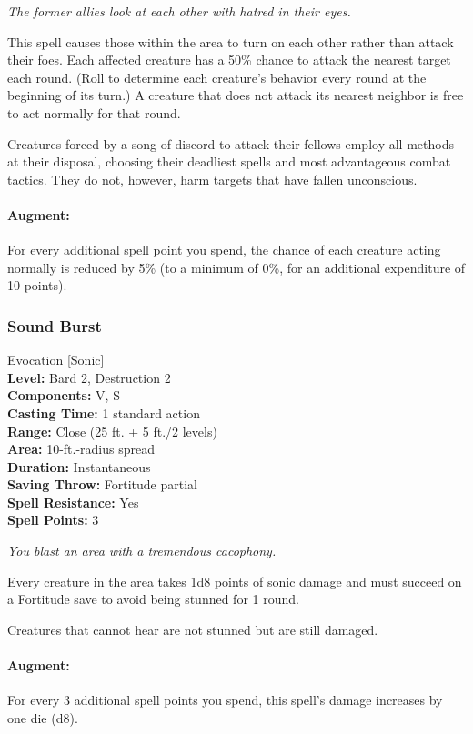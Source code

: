 \emph{The former allies look at each other with hatred in their eyes.}

This spell causes those within the area to turn on each other rather than attack their foes. Each affected creature has a 50\% chance to attack the nearest target each round. (Roll to determine each creature's behavior every round at the beginning of its turn.) A creature that does not attack its nearest neighbor is free to act normally for that round.

Creatures forced by a song of discord to attack their fellows employ all methods at their disposal, choosing their deadliest spells and most advantageous combat tactics. They do not, however, harm targets that have fallen unconscious.

\paragraph{Augment:} For every additional spell point you spend, the chance of each creature acting normally is reduced by 5\% (to a minimum of 0\%, for an additional expenditure of 10 points).
\subsubsection{Sound Burst}
\label{Spell:SoundBurst}
Evocation [Sonic]
\\ \textbf{Level:} Bard 2, Destruction 2
\\ \textbf{Components:} V, S
\\ \textbf{Casting Time:} 1 standard action
\\ \textbf{Range:} Close (25 ft. + 5 ft./2 levels)
\\ \textbf{Area:} 10-ft.-radius spread
\\ \textbf{Duration:} Instantaneous
\\ \textbf{Saving Throw:} Fortitude partial
\\ \textbf{Spell Resistance:} Yes
\\ \textbf{Spell Points:} 3

\emph{You blast an area with a tremendous cacophony. }

Every creature in the area takes 1d8 points of sonic damage and must succeed on a Fortitude save to avoid being stunned for 1 round.

Creatures that cannot hear are not stunned but are still damaged.

\paragraph{Augment:} For every 3 additional spell points you spend, this spell's damage increases by one die (d8).

